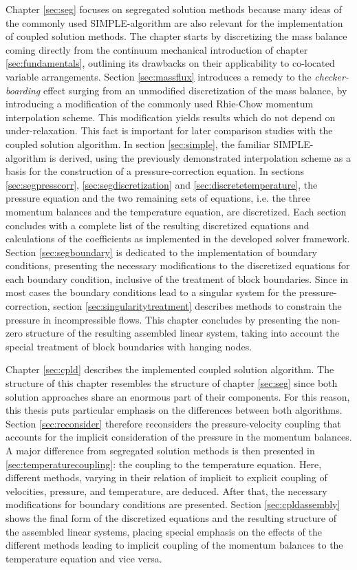 Chapter \ref{sec:seg} focuses on segregated solution methods because many ideas of the commonly used SIMPLE-algorithm are also relevant for the implementation of coupled solution methods. The chapter starts by discretizing the mass balance coming directly from the continuum mechanical introduction of chapter \ref{sec:fundamentals}, outlining its drawbacks on their applicability to co-located variable arrangements. Section \ref{sec:massflux} introduces a remedy to the \emph{checker-boarding} effect surging from an unmodified discretization of the mass balance, by introducing a modification of the commonly used Rhie-Chow \cite{rhie82} momentum interpolation scheme. This modification yields results which do not depend on under-relaxation. This fact is important for later comparison studies with the coupled solution algorithm. In section \ref{sec:simple}, the familiar SIMPLE-algorithm is derived, using the previously demonstrated interpolation scheme as a basis for the construction of a pressure-correction equation. In sections \ref{sec:segpresscorr}, \ref{sec:segdiscretization} and \ref{sec:discretetemperature}, the pressure equation and the two remaining sets of equations, i.e. the three momentum balances and the temperature equation, are discretized. Each section concludes with a complete list of the resulting discretized equations and calculations of the coefficients as implemented in the developed solver framework. Section \ref{sec:segboundary} is dedicated to the implementation of boundary conditions, presenting the necessary modifications to the discretized equations for each boundary condition, inclusive of the treatment of block boundaries. Since in most cases the boundary conditions lead to a singular system for the pressure-correction, section \ref{sec:singularitytreatment} describes methods to constrain the pressure in incompressible flows. This chapter concludes by presenting the non-zero structure of the resulting assembled linear system, taking into account the special treatment of block boundaries with hanging nodes.

Chapter \ref{sec:cpld} describes the implemented coupled solution algorithm. The structure of this chapter resembles the structure of chapter \ref{sec:seg} since both solution approaches share an enormous part of their components. For this reason, this thesis puts particular emphasis on the differences between both algorithms. Section \ref{sec:reconsider} therefore reconsiders the pressure-velocity coupling that accounts for the implicit consideration of the pressure in the momentum balances. A major difference from segregated solution methods is then presented in \ref{sec:temperaturecoupling}: the coupling to the temperature equation. Here, different methods, varying in their relation of implicit to explicit coupling of velocities, pressure, and temperature, are deduced. After that, the necessary modifications for boundary conditions are presented. Section \ref{sec:cpldassembly} shows the final form of the discretized equations and the resulting structure of the assembled linear systems, placing special emphasis on the effects of the different methods leading to implicit coupling of the momentum balances to the temperature equation and vice versa.

